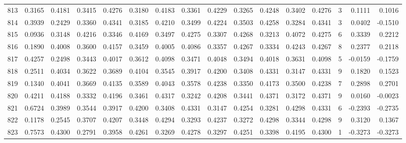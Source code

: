 \begin{tabular}{lrrrrrrrrrrrrrrr}
813 &      0.3165 &  0.4181 &  0.3415 &  0.4276 &  0.3180 &  0.4183 &  0.3361 &  0.4229 &  0.3265 &  0.4248 &   0.3402 &     0.4276 &      3 &                    0.1111 &                     0.1016 \\
814 &      0.3939 &  0.2429 &  0.3360 &  0.4341 &  0.3185 &  0.4210 &  0.3499 &  0.4224 &  0.3503 &  0.4258 &   0.3284 &     0.4341 &      3 &                    0.0402 &                    -0.1510 \\
815 &      0.0936 &  0.3148 &  0.4216 &  0.3346 &  0.4169 &  0.3497 &  0.4275 &  0.3307 &  0.4268 &  0.3213 &   0.4072 &     0.4275 &      6 &                    0.3339 &                     0.2212 \\
816 &      0.1890 &  0.4008 &  0.3600 &  0.4157 &  0.3459 &  0.4005 &  0.4086 &  0.3357 &  0.4267 &  0.3334 &   0.4243 &     0.4267 &      8 &                    0.2377 &                     0.2118 \\
817 &      0.4257 &  0.2498 &  0.3443 &  0.4017 &  0.3612 &  0.4098 &  0.3471 &  0.4048 &  0.3494 &  0.4018 &   0.3631 &     0.4098 &      5 &                   -0.0159 &                    -0.1759 \\
818 &      0.2511 &  0.4034 &  0.3622 &  0.3689 &  0.4104 &  0.3545 &  0.3917 &  0.4200 &  0.3408 &  0.4331 &   0.3147 &     0.4331 &      9 &                    0.1820 &                     0.1523 \\
819 &      0.1340 &  0.4041 &  0.3669 &  0.4135 &  0.3589 &  0.4043 &  0.3578 &  0.4238 &  0.3350 &  0.4173 &   0.3500 &     0.4238 &      7 &                    0.2898 &                     0.2701 \\
820 &      0.4211 &  0.4188 &  0.3332 &  0.4196 &  0.3461 &  0.4317 &  0.3242 &  0.4208 &  0.3441 &  0.4371 &   0.3172 &     0.4371 &      9 &                    0.0160 &                    -0.0023 \\
821 &      0.6724 &  0.3989 &  0.3544 &  0.3917 &  0.4200 &  0.3408 &  0.4331 &  0.3147 &  0.4254 &  0.3281 &   0.4298 &     0.4331 &      6 &                   -0.2393 &                    -0.2735 \\
822 &      0.1178 &  0.2545 &  0.3707 &  0.4207 &  0.3448 &  0.4294 &  0.3293 &  0.4237 &  0.3272 &  0.4298 &   0.3344 &     0.4298 &      9 &                    0.3120 &                     0.1367 \\
823 &      0.7573 &  0.4300 &  0.2791 &  0.3958 &  0.4261 &  0.3269 &  0.4278 &  0.3297 &  0.4251 &  0.3398 &   0.4195 &     0.4300 &      1 &                   -0.3273 &                    -0.3273 \\

\end{tabular}

